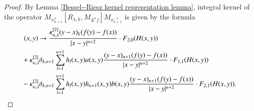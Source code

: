 \documentclass[12pt]{amsart}
\begin{document}
\begin{proof} By Lemma \ref{Bessel--Riesz kernel representation lemma}, integral kernel of the operator $M_{x_{n+1}^{\lambda}}[R_{\lambda,k},M_{E^{\ast}f}]M_{x_{n+1}^{-\lambda}}$ is given by the formula
\begin{align*}
(x,y)&\to\frac{\kappa^{[2]}_{n,\lambda}(y-x)_{k}(f(y)-f(x))}{|x-y|^{n+2}}\cdot F_{2,0}(H(x,y))\\
&\hspace{-0.8cm}+\kappa^{[2]}_{n,\lambda}\delta_{k,n+1}\sum_{l=1}^{n+1} h_l(x,y)a(x,y) \frac{(y-x)_{n+1}(f(y)-f(x))}{|x-y|^{n+2}}\cdot F_{1,1}(H(x,y))\\
&\hspace{-0.8cm}-\kappa^{[2]}_{n,\lambda}\delta_{k,n+1}\sum_{l=1}^{n+1} h_l(x,y)h_{n+1}(x,y)b(x,y) \frac{(y-x)_{n+1}(f(y)-f(x))}{|x-y|^{n+2}}\cdot F_{2,1}(H(x,y)).
\end{align*}


\end{proof}
\end{document}
